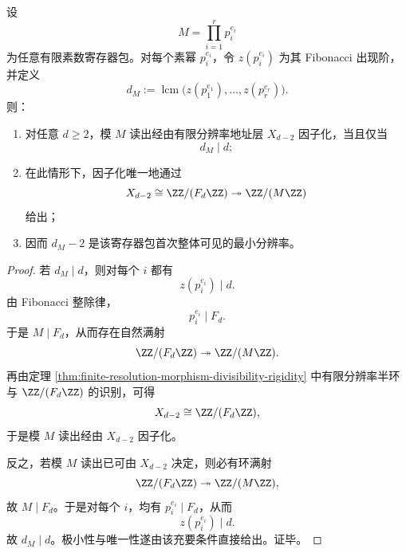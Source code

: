 \begin{theorem}\label{thm:conclusion-fibadic-minimal-resolution-for-prime-register-package}
设
\[
M=\prod_{i=1}^r p_i^{e_i}
\]
为任意有限素数寄存器包。对每个素幂 \(p_i^{e_i}\)，令 \(z(p_i^{e_i})\) 为其 Fibonacci 出现阶，并定义
\[
d_M:=\operatorname{lcm}\bigl(z(p_1^{e_1}),\dots,z(p_r^{e_r})\bigr).
\]
则：
\begin{enumerate}
  \item 对任意 \(d\ge 2\)，模 \(M\) 读出经由有限分辨率地址层 \(X_{d-2}\) 因子化，当且仅当
  \[
  d_M\mid d;
  \]
  \item 在此情形下，因子化唯一地通过
  \[
  X_{d-2}\cong \ZZ/(F_d\ZZ)\twoheadrightarrow \ZZ/(M\ZZ)
  \]
  给出；
  \item 因而 \(d_M-2\) 是该寄存器包首次整体可见的最小分辨率。
\end{enumerate}
\end{theorem}
\begin{proof}
若 \(d_M\mid d\)，则对每个 \(i\) 都有
\[
z(p_i^{e_i})\mid d.
\]
由 Fibonacci 整除律，
\[
p_i^{e_i}\mid F_d.
\]
于是 \(M\mid F_d\)，从而存在自然满射
\[
\ZZ/(F_d\ZZ)\twoheadrightarrow \ZZ/(M\ZZ).
\]
再由定理 \ref{thm:finite-resolution-morphism-divisibility-rigidity} 中有限分辨率半环与 \(\ZZ/(F_d\ZZ)\) 的识别，可得
\[
X_{d-2}\cong \ZZ/(F_d\ZZ),
\]
于是模 \(M\) 读出经由 \(X_{d-2}\) 因子化。

反之，若模 \(M\) 读出已可由 \(X_{d-2}\) 决定，则必有环满射
\[
\ZZ/(F_d\ZZ)\twoheadrightarrow \ZZ/(M\ZZ),
\]
故 \(M\mid F_d\)。于是对每个 \(i\)，均有 \(p_i^{e_i}\mid F_d\)，从而
\[
z(p_i^{e_i})\mid d.
\]
故 \(d_M\mid d\)。极小性与唯一性遂由该充要条件直接给出。证毕。
\end{proof}

